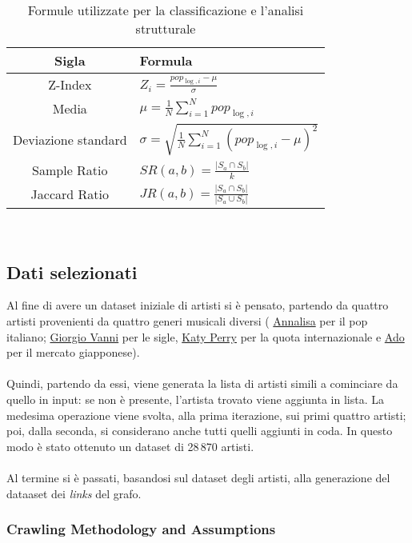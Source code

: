 \documentclass[sigchi]{acmart}
\begin{document}
\begin{table}[H]
\centering
\begin{tabular}{|c|>{\raggedright\arraybackslash}p{4cm}|}
\hline
\textbf{Sigla} & \textbf{Formula} \\
\hline
Z-Index &
$Z_i = \frac{pop_{\log,i} - \mu}{\sigma}$ \\
\hline
Media &
$\mu = \frac{1}{N} \sum_{i=1}^{N} pop_{\log,i}$ \\
\hline
Deviazione standard &
$\sigma = \sqrt{\frac{1}{N} \sum_{i=1}^{N} (pop_{\log,i} - \mu)^2}$ \\
\hline
Sample Ratio &
$SR(a, b) = \frac{|S_a \cap S_b|}{k}$ \\
\hline
Jaccard Ratio &
$JR(a, b) = \frac{|S_a \cap S_b|}{|S_a \cup S_b|}$ \\
\hline
\end{tabular}\\[15pt]
\caption{Formule utilizzate per la classificazione e l'analisi strutturale}
\end{table}


\subsection{Dati selezionati}

Al fine di avere un dataset iniziale di artisti si è pensato, partendo da quattro artisti provenienti da quattro generi musicali diversi ( \href{https://www.last.fm/music/Annalisa}{Annalisa} per il pop italiano; \href{https://www.last.fm/music/Giorgio+Vanni}{Giorgio Vanni} per le sigle, \href{https://www.last.fm/music/Katy+Perry}{Katy Perry} per la quota internazionale e \href{https://www.last.fm/music/Ado}{Ado} per il mercato giapponese). \\ \\ Quindi, partendo da essi, viene generata la lista di artisti simili a cominciare da quello in input: se non è presente, l'artista trovato viene aggiunta in lista. La medesima operazione viene svolta, alla prima iterazione, sui primi quattro artisti; poi, dalla seconda, si considerano anche tutti quelli aggiunti in coda. In questo modo è stato ottenuto un dataset di 28\,870 artisti. \\ \\ Al termine si è passati, basandosi sul dataset degli artisti, alla generazione del dataaset dei {\itshape links} del grafo.

\subsubsection{Crawling Methodology and Assumptions}
\end{document}
